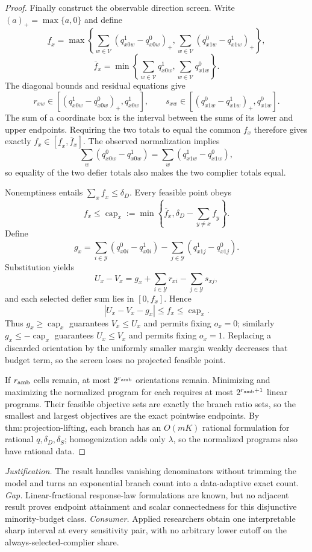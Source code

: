 \documentclass{article}
\begin{document}
\begin{proof}
Finally construct the observable direction screen. Write \((a)_+=\max\{a,0\}\) and define
\[
 \underline f_x=
 \max\left\{
 \sum_{w\in\mathcal V}(q^1_{x0w}-q^0_{x0w})_+,
 \sum_{w\in\mathcal V}(q^0_{x1w}-q^1_{x1w})_+
 \right\},
\]
\[
 \overline f_x=
 \min\left\{
 \sum_{w\in\mathcal V}q^1_{x0w},
 \sum_{w\in\mathcal V}q^0_{x1w}
 \right\}.
\]
The diagonal bounds and residual equations give
\[
 r_{xw}\in[(q^1_{x0w}-q^0_{x0w})_+,q^1_{x0w}],
 \qquad
 s_{xw}\in[(q^0_{x1w}-q^1_{x1w})_+,q^0_{x1w}].
\]
The sum of a coordinate box is the interval between the sums of its lower and upper endpoints. Requiring the two totals to equal the common \(f_x\) therefore gives exactly \(f_x\in[\underline f_x,\overline f_x]\). The observed normalization implies
\[
 \sum_w(q^0_{x0w}-q^1_{x0w})
 =\sum_w(q^1_{x1w}-q^0_{x1w}),
\]
so equality of the two defier totals also makes the two complier totals equal.

Nonemptiness entails \(\sum_x\underline f_x\leq\delta_D\). Every feasible point obeys
\[
 f_x\leq \operatorname{cap}_x
 :=\min\left\{\overline f_x,
 \delta_D-\sum_{y\ne x}\underline f_y\right\}.
\]
Define
\[
 g_x=
 \sum_{i\in\mathcal Y}(q^0_{x0i}-q^1_{x0i})
 -\sum_{j\in\mathcal Y}(q^1_{x1j}-q^0_{x1j}).
\]
Substitution yields
\[
 U_x-V_x
 =g_x+\sum_{i\in\mathcal Y}r_{xi}
       -\sum_{j\in\mathcal Y}s_{xj},
\]
and each selected defier sum lies in \([0,f_x]\). Hence
\[
 |U_x-V_x-g_x|\leq f_x\leq\operatorname{cap}_x.
\]
Thus \(g_x\geq\operatorname{cap}_x\) guarantees \(V_x\leq U_x\) and permits fixing \(o_x=0\); similarly \(g_x\leq-\operatorname{cap}_x\) guarantees \(U_x\leq V_x\) and permits fixing \(o_x=1\). Replacing a discarded orientation by the uniformly smaller margin weakly decreases that budget term, so the screen loses no projected feasible point.

If \(r_{\rm amb}\) cells remain, at most \(2^{r_{\rm amb}}\) orientations remain. Minimizing and maximizing the normalized program for each requires at most \(2^{r_{\rm amb}+1}\) linear programs. Their feasible objective sets are exactly the branch ratio sets, so the smallest and largest objectives are the exact pointwise endpoints. By \(\mathrm{thm:projection\text{-}lifting}\), each branch has an \(O(mK)\) rational formulation for rational \(q,\delta_D,\delta_S\); homogenization adds only \(\lambda\), so the normalized programs also have rational data.
\end{proof}
\par\smallskip\noindent \textit{Justification.} The result handles vanishing denominators without trimming the model and turns an exponential branch count into a data-adaptive exact count. \textit{Gap.} Linear-fractional response-law formulations are known, but no adjacent result proves endpoint attainment and scalar connectedness for this disjunctive minority-budget class. \textit{Consumer.} Applied researchers obtain one interpretable sharp interval at every sensitivity pair, with no arbitrary lower cutoff on the always-selected-complier share.
\end{document}
